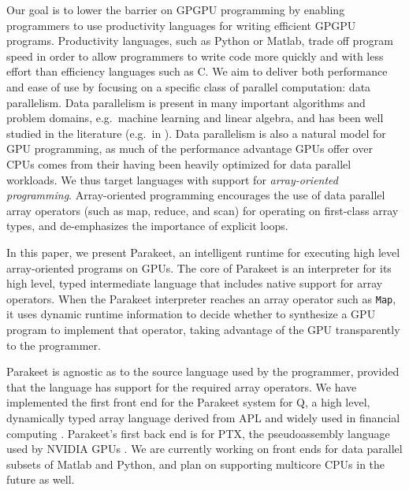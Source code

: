 \documentclass[preprint]{sigplanconf}
\begin{document}
Our goal is to lower the barrier on GPGPU programming by
enabling programmers to use productivity languages for writing
efficient GPGPU programs. Productivity languages, such as Python or Matlab,
trade off program speed in order to allow programmers to write code more quickly
and with less effort than efficiency languages such as C.  We aim to deliver
both performance and ease of use by focusing on a specific class of parallel
computation: data parallelism.  Data parallelism is present in many important
algorithms and problem domains, e.g.\ machine learning and linear algebra, and
has been well studied in the literature (e.g.\ in \cite{Blel90}).  Data
parallelism is also a natural
model for GPU programming, as much of the performance advantage GPUs offer over
CPUs comes from their having been heavily optimized for data parallel workloads.
 We thus target languages with support for \emph{array-oriented programming}.
Array-oriented programming encourages the use of data parallel array operators
(such as map, reduce, and scan) for operating on first-class array types, and
de-emphasizes the importance of explicit loops.

In this paper, we present Parakeet, an intelligent runtime for executing high
level array-oriented programs on GPUs.  The core of Parakeet is an interpreter
for its high level, typed intermediate language that includes native support for
array operators.  When the Parakeet interpreter reaches an array operator such
as {\tt Map}, it uses dynamic runtime information to decide whether to
synthesize a GPU program to implement that operator, taking advantage of the
GPU transparently to the programmer.

Parakeet is agnostic as to the source language used by the programmer, provided
that the language has support for the required array operators.  We have
implemented the first front end for the Parakeet system for Q, a high level,
dynamically typed array language derived from APL and widely used in financial
computing \cite{Borr08}. Parakeet's first back end is for PTX, the
pseudoassembly language used by NVIDIA GPUs \cite{NvidCU}.  We are currently
working on front ends for data parallel subsets of Matlab and Python, and plan
on supporting multicore CPUs in the future as well.
\end{document}

